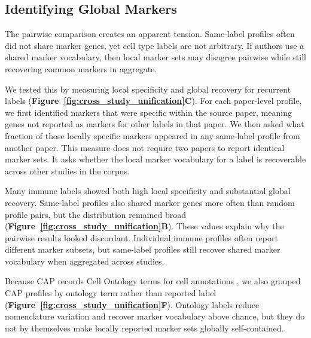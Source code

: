 \documentclass[10pt,twocolumn]{article}
\theoremstyle{plain}
\theoremstyle{definition}
\theoremstyle{remark}
\begin{document}
\subsection*{Identifying Global Markers}
The pairwise comparison creates an apparent tension. Same-label profiles often did not share marker genes, yet cell type labels are not arbitrary. If authors use a shared marker vocabulary, then local marker sets may disagree pairwise while still recovering common markers in aggregate.

We tested this by measuring local specificity and global recovery for recurrent labels (\textbf{Figure~\ref{fig:cross_study_unification}C}). For each paper-level profile, we first identified markers that were specific within the source paper, meaning genes not reported as markers for other labels in that paper. We then asked what fraction of those locally specific markers appeared in any same-label profile from another paper. This measure does not require two papers to report identical marker sets. It asks whether the local marker vocabulary for a label is recoverable across other studies in the corpus.

Many immune labels showed both high local specificity and substantial global recovery.  Same-label profiles also shared marker genes more often than random profile pairs, but the distribution remained broad (\textbf{Figure~\ref{fig:cross_study_unification}B}).  These values explain why the pairwise results looked discordant. Individual immune profiles often report different marker subsets, but same-label profiles still recover shared marker vocabulary when aggregated across studies.

Because CAP records Cell Ontology terms for cell annotations \citep{OsumiSutherland2021CellOntologies}, we also grouped CAP profiles by ontology term rather than reported label (\textbf{Figure~\ref{fig:cross_study_unification}F}).  Ontology labels reduce nomenclature variation and recover marker vocabulary above chance, but they do not by themselves make locally reported marker sets globally self-contained.
\end{document}
